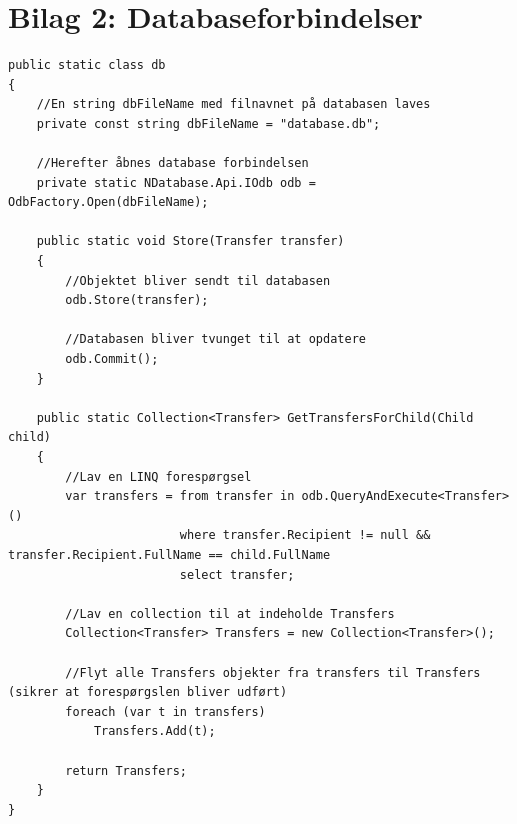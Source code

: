 \chapter*{Bilag 2: Databaseforbindelser}
\thispagestyle{empty}
\setcounter{page}{1}
\begin{lstlisting}[caption={Statisk klasse, der forbinder til objekt databasen NDatabase},label={lst:db}]
public static class db
{
	//En string dbFileName med filnavnet på databasen laves
	private const string dbFileName = "database.db";
	
	//Herefter åbnes database forbindelsen
	private static NDatabase.Api.IOdb odb = OdbFactory.Open(dbFileName);

	public static void Store(Transfer transfer)
	{
		//Objektet bliver sendt til databasen
		odb.Store(transfer);
		
		//Databasen bliver tvunget til at opdatere
		odb.Commit();
	}
	
	public static Collection<Transfer> GetTransfersForChild(Child child)
	{
		//Lav en LINQ forespørgsel
		var transfers = from transfer in odb.QueryAndExecute<Transfer>()
						where transfer.Recipient != null && transfer.Recipient.FullName == child.FullName
						select transfer;

		//Lav en collection til at indeholde Transfers
		Collection<Transfer> Transfers = new Collection<Transfer>();

		//Flyt alle Transfers objekter fra transfers til Transfers (sikrer at forespørgslen bliver udført)
		foreach (var t in transfers)
			Transfers.Add(t);

		return Transfers;
	}
}
\end{lstlisting}
\vspace{1cm}
